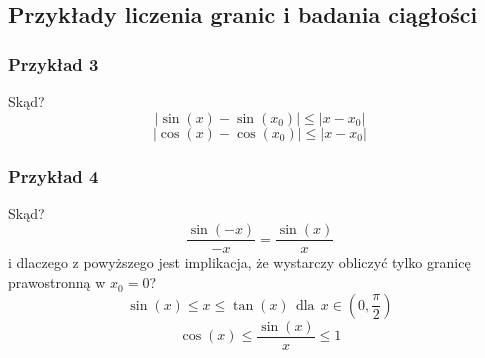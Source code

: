 \documentclass{article}
\begin{document}
\subsection{Przykłady liczenia granic i badania ciągłości}
\subsubsection{Przykład 3}
Skąd?
\begin{equation*}
    |\sin(x) - \sin(x_0)| \leq |x - x_0|
\end{equation*}
\begin{equation*}
    |\cos(x) - \cos(x_0)| \leq |x - x_0|
\end{equation*}

\subsubsection{Przykład 4}
Skąd?
\begin{equation*}
    \frac{\sin(-x)}{-x} = \frac{\sin(x)}{x}
\end{equation*}
i dlaczego z powyższego jest implikacja, że wystarczy obliczyć tylko granicę prawostronną w \(x_0 = 0\)?
\begin{equation*}
    \sin(x) \leq x \leq \tan(x) \ \ \mbox{dla} \ \ x \in (0, \frac{\pi}{2})
\end{equation*}
\begin{equation*}
    \cos(x) \leq \frac{\sin(x)}{x} \leq 1
\end{equation*}
\end{document}
